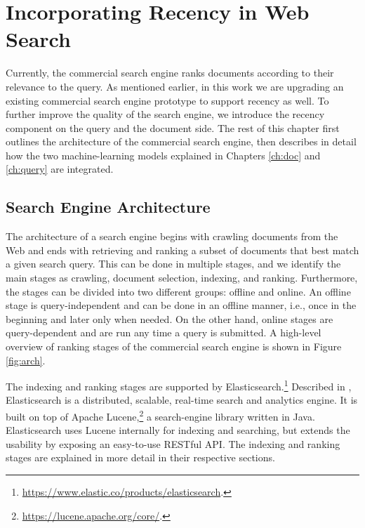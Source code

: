 \chapter{Incorporating Recency in Web Search}
\label{ch:webranking}

Currently, the commercial search engine ranks documents according to their relevance to the query. As mentioned earlier, in this work we are upgrading an existing commercial search engine prototype to support recency as well. To further improve the quality of the search engine, we introduce the recency component on the query and the document side. The rest of this chapter first outlines the architecture of the commercial search engine, then describes in detail how the two machine-learning models explained in Chapters \ref{ch:doc} and \ref{ch:query} are integrated.

\section{Search Engine Architecture}

The architecture of a search engine begins with crawling documents from the Web and ends with retrieving and ranking a subset of documents that best match a given search query. This can be done in multiple stages, and we identify the main stages as crawling, document selection, indexing, and ranking. Furthermore, the stages can be divided into two different groups: offline and online. An offline stage is query-independent and can be done in an offline manner, i.e., once in the beginning and later only when needed. On the other hand, online stages are query-dependent and are run any time a query is submitted. A high-level overview of ranking stages of the commercial search engine is shown in Figure \ref{fig:arch}.

The indexing and ranking stages are supported by Elasticsearch.\footnote{\url{https://www.elastic.co/products/elasticsearch}.} Described in \citep{gormley2015elasticsearch}, Elasticsearch is a distributed, scalable, real-time search and analytics engine. It is built on top of Apache Lucene,\footnote{\url{https://lucene.apache.org/core/}.} a search-engine library written in Java. Elasticsearch uses Lucene internally for indexing and searching, but extends the usability by exposing an easy-to-use RESTful API. The indexing and ranking stages are explained in more detail in their respective sections.

